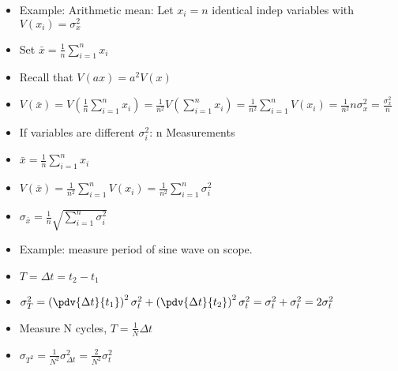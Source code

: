 \begin{itemize}
    \item Example: Arithmetic mean: Let $x_i = n$ identical indep variables with $V(x_i) = \sigma_x^2$
    \item Set $\bar{x} = \frac{1}{n} \sum_{i=1}^{n} x_i$
    \item Recall that $V(a x) = a^2 V(x)$
    \item $V(\bar{x}) = V(\frac{1}{n} \sum_{i=1}^{n} x_i) = \frac{1}{n^2} V(\sum_{i=1}^{n} x_i) = \frac{1}{n^2} \sum_{i=1}^{n} V(x_i) = \frac{1}{n^2} n \sigma_x^2 = \frac{\sigma_x^2}{n}$
    \item If variables are different $\sigma_i^2$: n Measurements
    \item $\bar{x} = \frac{1}{n} \sum_{i=1}^{n} x_i$
    \item $V(\bar{x}) = \frac{1}{n^2} \sum_{i=1}^{n} V(x_i) = \frac{1}{n^2} \sum_{i=1}^{n} \sigma_i^2$
    \item $\sigma_{\bar{x}} = \frac{1}{n} \sqrt{\sum_{i=1}^{n} \sigma_i^2}$
    \item Example: measure period of sine wave on scope.
    \item $T = \Delta t = t_2 - t_1$
    \item $\sigma_T^2 = \left(\pdv{\Delta t}{t_1} \right)^2 \sigma_{t}^2 + \left(\pdv{\Delta t}{t_2} \right)^2 \sigma_{t}^2 = \sigma_t^2 + \sigma_t^2 = 2 \sigma_t^2$
    \item Measure N cycles, $T = \frac{1}{N} \Delta t $
    \item $ \sigma_{T^2} = \frac{1}{N^2} \sigma_{\Delta t}^2 = \frac{2}{N^2} \sigma_t^2$
\end{itemize}